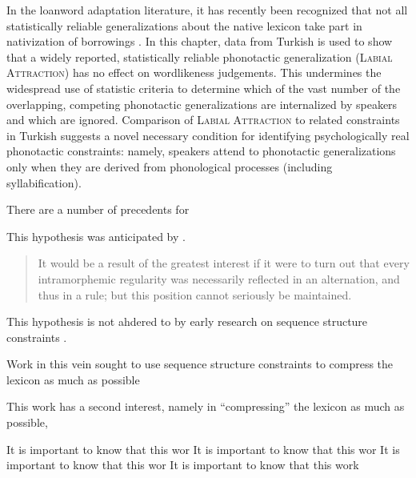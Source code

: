 In the loanword adaptation literature, it has recently been recognized that not all statistically reliable generalizations about the native lexicon take part in nativization of borrowings \citep[e.g.,][]{Ito1995a,Ito1995b,Ussishkin2003}. In this chapter, data from Turkish is used to show that a widely reported, statistically reliable phonotactic generalization (\textsc{Labial Attraction}) has no effect on wordlikeness judgements. This undermines the widespread use of statistic criteria to determine which of the vast number of the overlapping, competing phonotactic generalizations are internalized by speakers and which are ignored. Comparison of \textsc{Labial Attraction} to related constraints in Turkish suggests a novel necessary condition for identifying psychologically real phonotactic constraints: namely, speakers attend to phonotactic generalizations only when they are derived from phonological processes (including syllabification).

There are a number of precedents for 

This hypothesis was anticipated by \cite[][283]{Anderson1974}.

\begin{quote}
It would be a result of the greatest interest if it were to turn out that every intramorphemic regularity was necessarily reflected in an alternation, and thus in a rule; but this position cannot seriously be maintained. \citep[][283]{Anderson1974}
\end{quote}



This hypothesis is not ahdered to by early research on sequence structure constraints \citep[e.g.,][]{SPR,Chomsky1965,SPE,Stanley1967}. 


Work in this vein sought to use sequence structure constraints to compress the lexicon as much as possible 


This work has a second interest, namely in ``compressing'' the lexicon as much as possible, 



It is important to know that this wor It is important to know that this wor It is important to know that this wor It is important to know that this work


